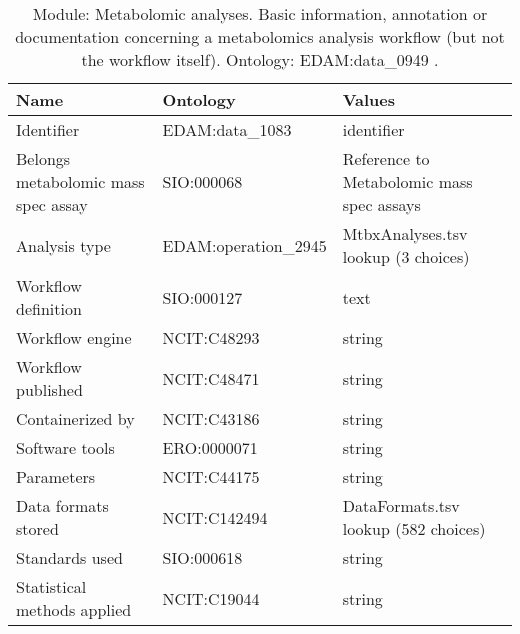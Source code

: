 \documentclass{article}
\begin{document}
\begin{table}[htb]
\begin{tabular}{lll}
Name & Ontology & Values \\
\hline
Identifier & EDAM:data\_1083  & identifier \\
Belongs metabolomic mass spec assay & SIO:000068  & Reference to Metabolomic mass spec assays \\
Analysis type & EDAM:operation\_2945  & MtbxAnalyses.tsv lookup (3 choices) \\
Workflow definition & SIO:000127  & text \\
Workflow engine & NCIT:C48293  & string \\
Workflow published & NCIT:C48471  & string \\
Containerized by & NCIT:C43186  & string \\
Software tools & ERO:0000071  & string \\
Parameters & NCIT:C44175  & string \\
Data formats stored & NCIT:C142494  & DataFormats.tsv lookup (582 choices) \\
Standards used & SIO:000618  & string \\
Statistical methods applied & NCIT:C19044  & string \\
\hline
\end{tabular}
\caption[Module: Metabolomic analyses]{\label{table:table19} Module: Metabolomic analyses. Basic information, annotation or documentation concerning a metabolomics analysis workflow (but not the workflow itself). Ontology: EDAM:data\_0949 . }
\end{table}
\end{document}

